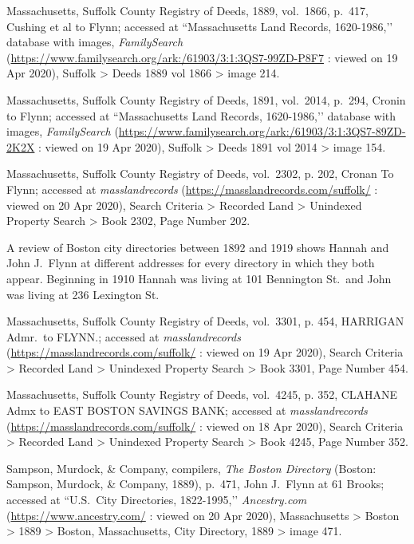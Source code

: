 \begin{thebibliography}{99}
	Massachusetts, Suffolk County Registry of Deeds, 1889, vol.\ 1866, p.\ 417, Cushing et al to Flynn; accessed at ``Massachusetts Land Records, 1620-1986,’’ database with images, \textit{FamilySearch} (\url{https://www.familysearch.org/ark:/61903/3:1:3QS7-99ZD-P8F7} : viewed on 19 Apr 2020), Suffolk > Deeds 1889 vol 1866 > image 214.
	
	Massachusetts, Suffolk County Registry of Deeds, 1891, vol.\ 2014, p.\ 294, Cronin to Flynn; accessed at ``Massachusetts Land Records, 1620-1986,’’ database with images, \textit{FamilySearch} (\url{https://www.familysearch.org/ark:/61903/3:1:3QS7-89ZD-2K2X} : viewed on 19 Apr 2020), Suffolk > Deeds 1891 vol 2014 > image 154.
	
	Massachusetts, Suffolk County Registry of Deeds, vol.\ 2302, p. 202, Cronan To Flynn; accessed at \textit{masslandrecords} (\url{https://masslandrecords.com/suffolk/} : viewed on 20 Apr 2020), Search Criteria > Recorded Land > Unindexed Property Search > Book 2302, Page Number 202.
	
	A review of Boston city directories between 1892 and 1919 shows Hannah and John J.\ Flynn at different addresses for every directory in which they both appear. Beginning in 1910 Hannah was living at 101 Bennington St.\ and John was living at 236 Lexington St.
	
	Massachusetts, Suffolk County Registry of Deeds, vol.\ 3301, p. 454, HARRIGAN Admr.\ to FLYNN.; accessed at \textit{masslandrecords} (\url{https://masslandrecords.com/suffolk/} : viewed on 19 Apr 2020), Search Criteria > Recorded Land > Unindexed Property Search >  Book 3301, Page Number 454.
	
	Massachusetts, Suffolk County Registry of Deeds, vol.\ 4245, p. 352, CLAHANE Admx to EAST BOSTON SAVINGS BANK; accessed at \textit{masslandrecords} (\url{https://masslandrecords.com/suffolk/} : viewed on 18 Apr 2020), Search Criteria > Recorded Land > Unindexed Property Search > Book 4245, Page Number 352.
	
	Sampson, Murdock, \& Company, compilers, \textit{The Boston Directory} (Boston: Sampson, Murdock, \& Company, 1889), p.\ 471, John J.\ Flynn at 61 Brooks; accessed at ``U.S.\ City Directories, 1822-1995,’’ \textit{Ancestry.com} (\url{https://www.ancestry.com/} : viewed on 20 Apr 2020), Massachusetts > Boston > 1889 > Boston, Massachusetts, City Directory, 1889 > image 471.
	

\end{thebibliography}
